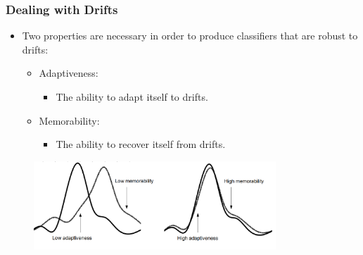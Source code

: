 \documentclass[14pt]{beamer}
\begin{document}



\begin{frame}\frametitle{Dealing with Drifts}

\begin{itemize}
\item Two properties are necessary in order to produce classifiers that are robust to drifts:
\begin{itemize}
\item Adaptiveness:
\begin{itemize}
\item The ability to adapt itself to drifts.
\end{itemize}
\item Memorability:
\begin{itemize}
\item The ability to recover itself from drifts.
\end{itemize}
\end{itemize}
\end{itemize}

\begin{figure}
\centering
\includegraphics[height=1.30in]{drift3}
\end{figure}
\end{frame}
\end{document}
